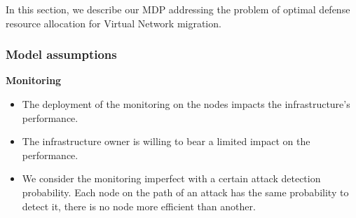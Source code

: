 \label{sec:mdp-model}
In this section, we describe our MDP addressing the problem of optimal defense resource allocation for Virtual Network migration.

\subsubsection{Model assumptions}
\label{sec:mdp-model-assumption}

\textbf{Monitoring}
\begin{itemize}
    \item The deployment of the monitoring on the nodes impacts the infrastructure's performance. 
    
    \item The infrastructure owner is willing to bear a limited impact on the performance.
    
    \item We consider the monitoring imperfect with a certain attack detection probability.
    Each node on the path of an attack has the same probability to detect it, \ie there is no node more efficient than another. 
\end{itemize}


